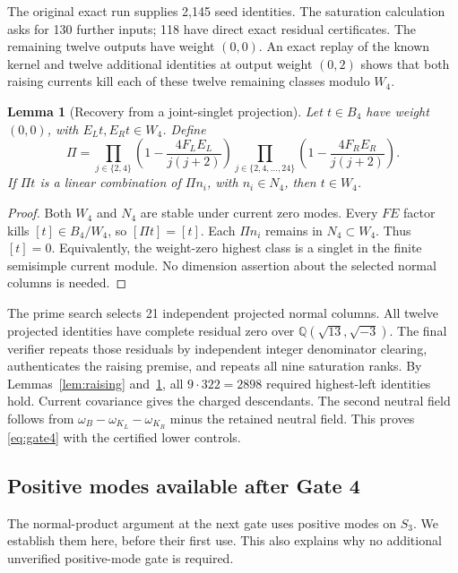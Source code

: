 \documentclass[11pt,a4paper]{article}
\newtheorem{lemma}[theorem]{Lemma}
\theoremstyle{definition}
\newcommand{\QQ}{\mathbb Q}
\begin{document}
The original exact run supplies 2,145 seed identities. The saturation
calculation asks for 130 further inputs; 118 have direct exact residual
certificates. The remaining twelve outputs have weight \((0,0)\).
An exact replay of the known kernel and twelve additional identities
at output weight \((0,2)\) shows that both raising currents kill each
of these twelve remaining classes modulo \(W_4\).

\begin{lemma}[Recovery from a joint-singlet projection]\label{lem:singlet}
Let \(t\in B_4\) have weight \((0,0)\), with
\(E_Lt,E_Rt\in W_4\). Define
\begin{equation}\label{eq:projector}
 \Pi=\prod_{j\in\{2,4\}}
       \left(1-\frac{4F_LE_L}{j(j+2)}\right)
       \prod_{j\in\{2,4,\ldots,24\}}
       \left(1-\frac{4F_RE_R}{j(j+2)}\right).
\end{equation}
If \(\Pi t\) is a linear combination of \(\Pi n_i\), with
\(n_i\in N_4\), then \(t\in W_4\).
\end{lemma}
\begin{proof}
Both \(W_4\) and \(N_4\) are stable under current zero modes.
Every \(FE\) factor kills \([t]\in B_4/W_4\), so
\([\Pi t]=[t]\). Each \(\Pi n_i\) remains in \(N_4\subset W_4\).
Thus \([t]=0\). Equivalently, the weight-zero highest class is a singlet
in the finite semisimple current module. No dimension assertion about
the selected normal columns is needed.
\end{proof}

The prime search selects 21 independent projected normal columns.
All twelve projected identities have complete residual zero over
\(\QQ(\sqrt{13},\sqrt{-3})\). The final verifier repeats those
residuals by independent integer denominator clearing, authenticates
the raising premise, and repeats all nine saturation ranks. By
Lemmas~\ref{lem:raising} and~\ref{lem:singlet}, all \(9\cdot322=2898\)
required highest-left identities hold. Current covariance gives the
charged descendants. The second neutral field follows from
\(\omega_B-\omega_{K_L}-\omega_{K_R}\) minus the retained neutral field.
This proves \eqref{eq:gate4} with the certified lower controls.

\subsection{Positive modes available after Gate 4}
\label{sec:bootstrap}
The normal-product argument at the next gate uses positive modes on
$S_3$. We establish them here, before their first use. This also explains
why no additional unverified positive-mode gate is required.
\end{document}
